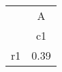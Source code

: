 \begin{tabular}{l*{1}{c}}
\hline\hline
            &           A\\
            &          c1\\
\hline
r1          &        0.39\\
\hline\hline
\end{tabular}

